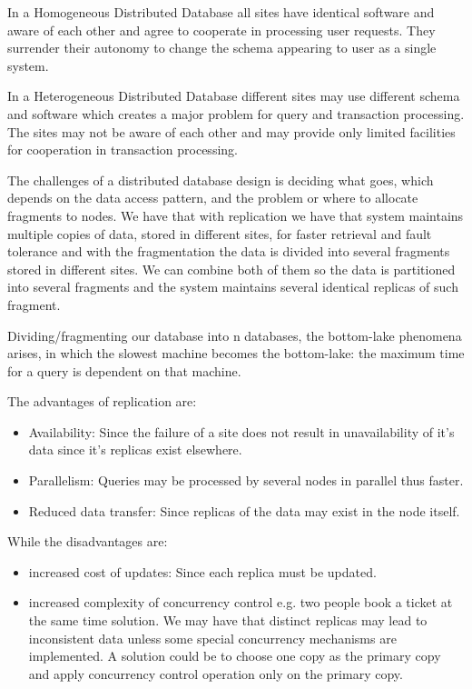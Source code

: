 \documentclass[a4page, 11pt]{article}
\begin{document}
In a Homogeneous Distributed Database all sites have identical software and aware of each other and agree to cooperate in processing user requests. They surrender their autonomy to change the schema appearing to user as a single system.

In a Heterogeneous Distributed Database different sites may use different schema and software which creates a major problem for query and transaction processing. The sites may not be aware of each other and may provide only limited facilities for cooperation in transaction processing.

The challenges of a distributed database design is deciding what goes, which depends on the data access pattern, and the problem or where to allocate fragments to nodes.
We have that with replication we have that system maintains multiple copies of data, stored in different sites, for faster retrieval and fault tolerance and with the fragmentation the data is divided into several fragments stored in different sites. We can combine both of them so the data is partitioned into several fragments and the system maintains several identical replicas of such fragment.

Dividing/fragmenting our database into n databases, the bottom-lake phenomena arises, in which the slowest machine becomes the bottom-lake: the maximum time for a query is dependent on that machine.

The advantages of replication are:
\begin{itemize}[noitemsep]
	\item
	Availability: Since the failure of a site does not result in unavailability of it's data since it's replicas exist elsewhere.
	\item
	Parallelism: Queries may be processed by several nodes in parallel thus faster.
	\item
	Reduced data transfer: Since replicas of the data may exist in the node itself.
\end{itemize}

While the disadvantages are:

\begin{itemize}[noitemsep]
	 
	\item
	increased cost of updates: Since each replica must be updated.
	\item
	increased complexity of concurrency control e.g. two people book a ticket at the same time solution. We may have that distinct replicas may lead to inconsistent data unless some special concurrency mechanisms are implemented. A solution could be to choose one copy as the primary copy and apply concurrency control operation only on the primary copy.
\end{itemize}
\end{document}
